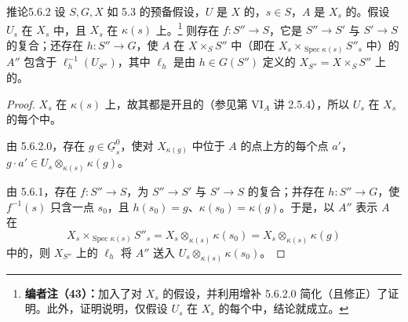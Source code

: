 \begin{SGAresult}{推论}{5.6.2}
设 $S,G,X$ 如 5.3 的预备假设，$U$ 是 $X$ 的，$s\in S$，$A$ 是 $X_s$ 的。假设 $U_s$ 在 $X_s$ 中，且 $X_s$ 在 $\kappa(s)$ 上。\footnote{\textbf{编者注（43）：}加入了对 $X_s$ 的假设，并利用增补 5.6.2.0 简化（且修正）了证明。此外，证明说明，仅假设 $U_s$ 在 $X_s$ 的每个中，结论就成立。}
则存在 $f:S''\to S$，它是 $S''\to S'$ 与 $S'\to S$ 的复合；还存在 $h:S''\to G$，使 $A$ 在 $X\times_SS''$ 中（即在 $X_s\times_{\operatorname{Spec}\kappa(s)}S''_s$ 中）的 $A''$ 包含于 $\ell_h^{-1}(U_{S''})$，其中 $\ell_h$ 是由 $h\in G(S'')$ 定义的 $X_{S''}=X\times_SS''$ 上的。
\end{SGAresult}
\begin{proof}
$X_s$ 在 $\kappa(s)$ 上，故其都是开且的（参见第 VI$_A$ 讲 2.5.4），所以 $U_s$ 在 $X_s$ 的每个中。

由 5.6.2.0，存在 $g\in\underline G_s^0$，使对 $X_{\kappa(g)}$ 中位于 $A$ 的点上方的每个点 $a'$，$g\cdot a'\in U_s\otimes_{\kappa(s)}\kappa(g)$。

由 5.6.1，存在 $f:S''\to S$，为 $S''\to S'$ 与 $S'\to S$ 的复合；并存在 $h:S''\to G$，使 $f^{-1}(s)$ 只含一点 $s_0$，且 $h(s_0)=g$、$\kappa(s_0)=\kappa(g)$。于是，以 $A''$ 表示 $A$ 在
\[
X_s\times_{\operatorname{Spec}\kappa(s)}S''_s
=X_s\otimes_{\kappa(s)}\kappa(s_0)
=X_s\otimes_{\kappa(s)}\kappa(g)
\]
中的，则 $X_{S''}$ 上的 $\ell_h$ 将 $A''$ 送入 $U_s\otimes_{\kappa(s)}\kappa(s_0)$。
\end{proof}
